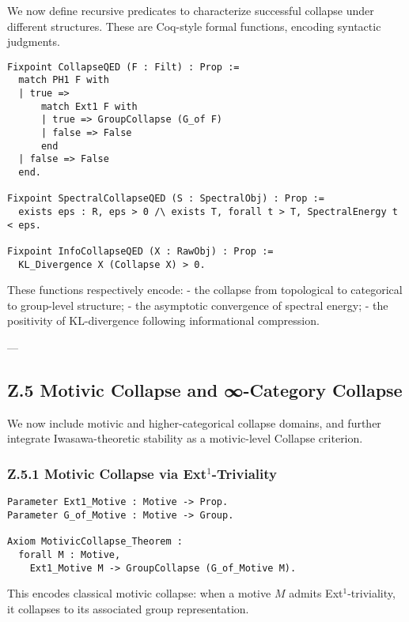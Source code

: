 \documentclass[11pt]{article}
\begin{document}
We now define recursive predicates to characterize successful collapse under different structures. These are Coq-style formal functions, encoding syntactic judgments.

\begin{lstlisting}[language=Coq, mathescape=false]
Fixpoint CollapseQED (F : Filt) : Prop :=
  match PH1 F with
  | true =>
      match Ext1 F with
      | true => GroupCollapse (G_of F)
      | false => False
      end
  | false => False
  end.

Fixpoint SpectralCollapseQED (S : SpectralObj) : Prop :=
  exists eps : R, eps > 0 /\ exists T, forall t > T, SpectralEnergy t < eps.

Fixpoint InfoCollapseQED (X : RawObj) : Prop :=
  KL_Divergence X (Collapse X) > 0.
\end{lstlisting}

These functions respectively encode:
- the collapse from topological to categorical to group-level structure;
- the asymptotic convergence of spectral energy;
- the positivity of KL-divergence following informational compression.

---

\subsection*{Z.5 Motivic Collapse and ∞-Category Collapse}

We now include motivic and higher-categorical collapse domains, and further integrate Iwasawa-theoretic stability as a motivic-level Collapse criterion.

\subsubsection*{Z.5.1 Motivic Collapse via Ext$^1$-Triviality}

\begin{lstlisting}[language=Coq]
Parameter Ext1_Motive : Motive -> Prop.
Parameter G_of_Motive : Motive -> Group.

Axiom MotivicCollapse_Theorem :
  forall M : Motive,
    Ext1_Motive M -> GroupCollapse (G_of_Motive M).
\end{lstlisting}

This encodes classical motivic collapse: when a motive \( M \) admits Ext$^1$-triviality, it collapses to its associated group representation.
\end{document}
